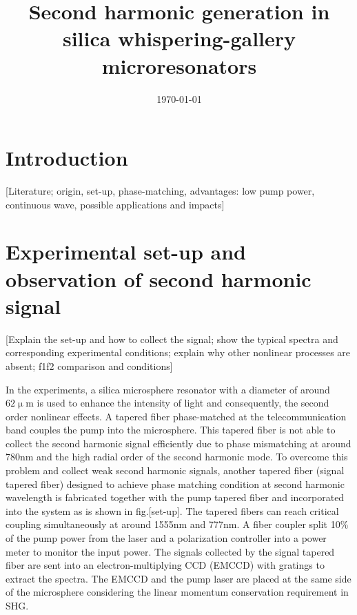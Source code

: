 \documentclass[a4paper,12pt,hyperref]{article}
\title{\bfseries \Large Second harmonic generation in silica whispering-gallery microresonators}
\date{\normalsize \today}
\begin{document}
\maketitle

\section{Introduction}

[Literature; origin, set-up, phase-matching, advantages: low pump power, continuous wave, possible applications and impacts]


\section{Experimental set-up and observation of second harmonic signal}
[Explain the set-up and how to collect the signal; show the typical spectra and corresponding experimental conditions; explain why other nonlinear processes are absent; f1f2 comparison and conditions]

In the experiments, a silica microsphere resonator with a diameter of around $62\upmu$m is used to enhance the intensity of light and  consequently, the second order nonlinear effects. A tapered fiber phase-matched at the telecommunication band couples the pump into the microsphere\cite{knight1997phase, cai2000observation}. This tapered fiber is not able to collect the second harmonic signal efficiently due to phase mismatching at around 780nm and the high radial order of the second harmonic mode\cite{carmon2007visible}. To overcome this problem and collect weak second harmonic signals, another tapered fiber (signal tapered fiber) designed to achieve phase matching condition at second harmonic wavelength is fabricated together with the pump tapered fiber and incorporated into the system as is shown in fig.[set-up]. The tapered fibers can reach critical coupling simultaneously at around 1555nm and 777nm. A fiber coupler split 10\% of the pump power from the laser and a polarization controller into a power meter to monitor the input power. The signals collected by the signal tapered fiber are sent into an electron-multiplying CCD (EMCCD) with gratings to extract the spectra. The EMCCD and the pump laser are placed at the same side of the microsphere considering the linear momentum conservation requirement in SHG\cite{carmon2007visible, kozyreff2008whispering}.
\end{document}
